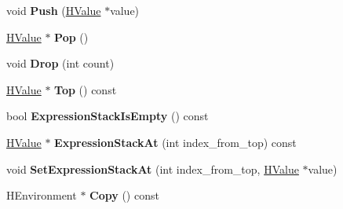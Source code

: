 \begin{DoxyCompactItemize}
\item 
\hypertarget{classv8_1_1internal_1_1_v8___f_i_n_a_l_a6b415640c80528d36faecda9c843ef60}{}void {\bfseries Push} (\hyperlink{classv8_1_1internal_1_1_h_value}{H\+Value} $\ast$value)\label{classv8_1_1internal_1_1_v8___f_i_n_a_l_a6b415640c80528d36faecda9c843ef60}

\item 
\hypertarget{classv8_1_1internal_1_1_v8___f_i_n_a_l_aa8901eaf8b581a12e4a81bc8e7993ca5}{}\hyperlink{classv8_1_1internal_1_1_h_value}{H\+Value} $\ast$ {\bfseries Pop} ()\label{classv8_1_1internal_1_1_v8___f_i_n_a_l_aa8901eaf8b581a12e4a81bc8e7993ca5}

\item 
\hypertarget{classv8_1_1internal_1_1_v8___f_i_n_a_l_ad166726526d001e502b9c2dd636abb5b}{}void {\bfseries Drop} (int count)\label{classv8_1_1internal_1_1_v8___f_i_n_a_l_ad166726526d001e502b9c2dd636abb5b}

\item 
\hypertarget{classv8_1_1internal_1_1_v8___f_i_n_a_l_ad3722e4d5c8063c3d25890cfc2448ca6}{}\hyperlink{classv8_1_1internal_1_1_h_value}{H\+Value} $\ast$ {\bfseries Top} () const \label{classv8_1_1internal_1_1_v8___f_i_n_a_l_ad3722e4d5c8063c3d25890cfc2448ca6}

\item 
\hypertarget{classv8_1_1internal_1_1_v8___f_i_n_a_l_af9ceb18561d3791a9049f9dab5d66c58}{}bool {\bfseries Expression\+Stack\+Is\+Empty} () const \label{classv8_1_1internal_1_1_v8___f_i_n_a_l_af9ceb18561d3791a9049f9dab5d66c58}

\item 
\hypertarget{classv8_1_1internal_1_1_v8___f_i_n_a_l_a188fbd94b50b2465e601d2542d72dd8c}{}\hyperlink{classv8_1_1internal_1_1_h_value}{H\+Value} $\ast$ {\bfseries Expression\+Stack\+At} (int index\+\_\+from\+\_\+top) const \label{classv8_1_1internal_1_1_v8___f_i_n_a_l_a188fbd94b50b2465e601d2542d72dd8c}

\item 
\hypertarget{classv8_1_1internal_1_1_v8___f_i_n_a_l_a1b16dc5348066833132e87cae8ec7fed}{}void {\bfseries Set\+Expression\+Stack\+At} (int index\+\_\+from\+\_\+top, \hyperlink{classv8_1_1internal_1_1_h_value}{H\+Value} $\ast$value)\label{classv8_1_1internal_1_1_v8___f_i_n_a_l_a1b16dc5348066833132e87cae8ec7fed}

\item 
\hypertarget{classv8_1_1internal_1_1_v8___f_i_n_a_l_a4a06ac40dca4cbb3b6a541ecd9429e31}{}H\+Environment $\ast$ {\bfseries Copy} () const \label{classv8_1_1internal_1_1_v8___f_i_n_a_l_a4a06ac40dca4cbb3b6a541ecd9429e31}


\end{DoxyCompactItemize}
